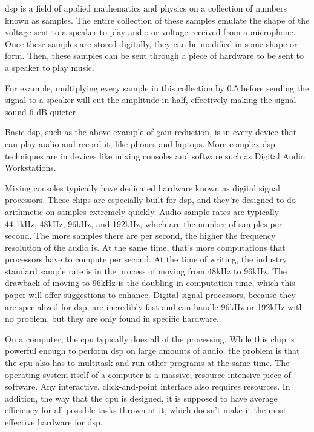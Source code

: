 
\indent \par \gls{dsp} is a field of applied mathematics and physics on a collection of numbers known as samples. The entire collection of these samples emulate the shape of the voltage sent to a speaker to play audio or voltage received from a microphone. Once these samples are stored digitally, they can be modified in some shape or form. Then, these samples can be sent through a piece of hardware to be sent to a speaker to play music.

For example, multiplying every sample in this collection by 0.5 before sending the signal to a speaker will cut the amplitude in half, effectively making the signal sound 6 dB quieter.

Basic \gls{dsp}, such as the above example of gain reduction, is in every device that can play audio and record it, like phones and laptops. More complex \gls{dsp} techniques are in devices like mixing consoles and software such as Digital Audio Workstations.

Mixing consoles typically have dedicated hardware known as digital signal processors. These chips are especially built for \gls{dsp}, and they're designed to do arithmetic on samples extremely quickly. Audio sample rates are typically 44.1kHz, 48kHz, 96kHz, and 192kHz, which are the number of samples per second. The more samples there are per second, the higher the frequency resolution of the audio is. At the same time, that's more computations that processors have to compute per second. At the time of writing, the industry standard sample rate is in the process of moving from 48kHz to 96kHz. The drawback of moving to 96kHz is the doubling in computation time, which this paper will offer suggestions to enhance. Digital signal processors, because they are specialized for \gls{dsp}, are incredibly fast and can handle 96kHz or 192kHz with no problem, but they are only found in specific hardware.

On a computer, the \gls{cpu} typically does all of the processing. While this chip is powerful enough to perform \gls{dsp} on large amounts of audio, the problem is that the \gls{cpu} also has to multitask and run other programs at the same time. The operating system itself of a computer is a massive, resource-intensive piece of software. Any interactive, click-and-point interface also requires resources. In addition, the way that the \gls{cpu} is designed, it is supposed to have average efficiency for all possible tasks thrown at it, which doesn't make it the most effective hardware for \gls{dsp}.

